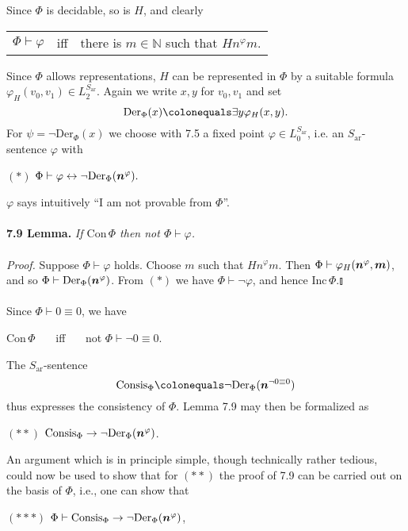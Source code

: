 \documentclass[leqno]{report}
\newcommand{\nat}{\mathbb{N}}
\newcommand{\ar}{\mathrm{ar}}
\newcommand{\con}{\mathrm{Con} \,} %
\newcommand{\inc}{\mathrm{Inc} \,} %
\newcommand{\Der}[1]{\mathrm{Der}_{#1}}
\newcommand{\consis}[1]{\mathrm{Consis}_{#1}}
\newcommand{\mbf}[1]{{\mbox{\boldmath\begin{math}#1\end{math}}}}
\begin{document}
Since $\Phi$ is decidable, so is $H$, and clearly
\begin{center}
\begin{tabular}{lll}
$\Phi \vdash \varphi$ & iff & there is $m \in \nat$ such that $Hn^\varphi m$.
\end{tabular}
\end{center}
Since $\Phi$ allows representations, $H$ can be represented in $\Phi$ by a suitable formula $\varphi_H(v_0, v_1) \in L_2^{S_\ar}$. Again we write $x, y$ for $v_0, v_1$ and set
\[
\Der{\Phi}(x) \colonequals \exists y \varphi_H(x, y).
\]
For $\psi = \neg\Der{\Phi}(x)$ we choose with 7.5 a fixed point $\varphi \in L_0^{S_\ar}$, i.e. an $S_\ar$-sentence $\varphi$ with
\begin{center}
$(*)$ \hfill $\Phi \vdash \varphi \leftrightarrow \neg\Der{\Phi}(\mbf{n}^\varphi).$ \hfill \phantom{(*)}
\end{center}
$\varphi$ says intuitively ``I am not provable from $\Phi$''.\\
\\
\textbf{7.9 Lemma.} \emph{If $\con \Phi$ then not $\Phi \vdash \varphi$.}\\
\ \\
\textit{Proof.} Suppose $\Phi \vdash \varphi$ holds. Choose $m$ such that $Hn^\varphi m$. Then $\Phi \vdash \varphi_H(\mbf{n}^\varphi, \mbf{m})$, and so $\Phi \vdash \Der{\Phi}(\mbf{n}^\varphi)$. From $(*)$ we have $\Phi \vdash \neg\varphi$, and hence $\inc \Phi$.\nolinebreak\hfill$\talloblong$\\
\ \\
Since $\Phi \vdash 0 \equiv 0$, we have
\begin{center}
$\con \Phi$ \ \ \ iff \ \ \ not $\Phi \vdash \neg 0 \equiv 0$.
\end{center}
The $S_\ar$-sentence
\[
\consis{\Phi} \colonequals \neg\Der{\Phi}(\mbf{n}^{\neg 0 \equiv 0})
\]
thus expresses the consistency of $\Phi$. Lemma 7.9 may then be formalized as
\begin{center}
$(**)$ \hfill $\consis{\Phi} \rightarrow \neg\Der{\Phi}(\mbf{n}^\varphi)$. \hfill \phantom{(**)}
\end{center}
An argument which is in principle simple, though technically rather tedious, could now be used to show that for $(**)$ the proof of 7.9 can be carried out on the basis of $\Phi$, i.e., one can show that
\begin{center}
$(***)$ \hfill $\Phi \vdash \consis{\Phi} \rightarrow \neg\Der{\Phi}(\mbf{n}^\varphi)$, \hfill \phantom{(***)}
\end{center}
\end{document}
